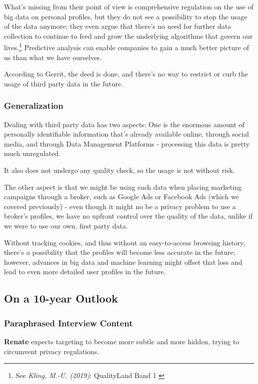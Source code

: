 What's missing from their point of view is comprehensive regulation on the use of big data on personal profiles, but they do not see a possibility to stop the usage of the data anymore; they even argue that there's no need for further data collection to continue to feed and grow the underlying algorithms that govern our lives.\footnote{See \textit{Kling, M.-U. (2019)}: QualityLand Band 1 \cite{qualityLand}} Predictive analysis can enable companies to gain a much better picture of us than what we have ourselves.

According to Gerrit, the deed is done, and there's no way to restrict or curb the usage of third party data in the future.

\subsubsection{Generalization}

Dealing with third party data has two aspects: One is the enormous amount of personally identifiable information that's already available online, through social media, and through Data Management Platforms - processing this data is pretty much unregulated. 

It also does not undergo any quality check, so the usage is not without risk.

The other aspect is that we might be using such data when placing marketing campaigns through a broker, such as Google Ads or Facebook Ads (which we covered previously) - even though it might no be a privacy problem to use a broker's profiles, we have no upfront control over the quality of the data, unlike if we were to use our own, first party data.

Without tracking cookies, and thus without an easy-to-access browsing history, there's a possibility that the profiles will become less accurate in the future; however, advances in big data and machine learning might offset that loss and lead to even more detailed user profiles in the future.

\subsection{On a 10-year Outlook}

\subsubsection{Paraphrased Interview Content}

\textbf{Renate} expects targeting to become more subtle and more hidden, trying to circumvent privacy regulations.

